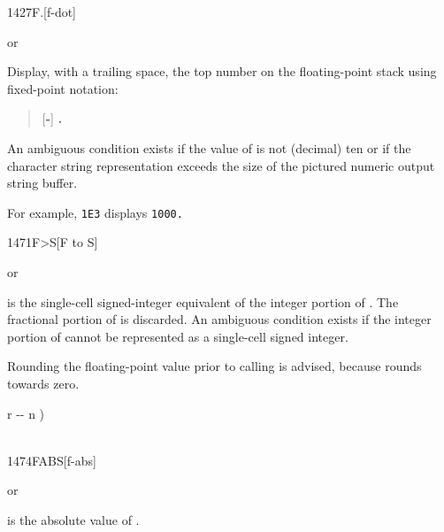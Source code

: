 \enlargethispage{8ex}\vspace*{-1ex}
\begin{worddef}[Fd]{1427}{F.{}}[f-dot]
\item \stack{}{}  or

	Display, with a trailing space, the top number on the
	floating-point stack using fixed-point notation:
	\begin{quote}
		[\textbf{-}] \textbf{.}
	\end{quote}
	An ambiguous condition exists if the value of 
	is not (decimal) ten or if the character string representation
	exceeds the size of the pictured numeric output string buffer.


	\begin{rationale} %
		For example, \texttt{1E3}  displays \texttt{1000.}
	\end{rationale}
\end{worddef}

\vspace*{-1.5ex}
\begin{worddef}[FtoS]{1471}{F>S}[F to S]%
\item {}  or 

	 is the single-cell signed-integer equivalent of the
	integer portion of .  The fractional portion of
	 is discarded.  An ambiguous condition exists if
	the integer portion of  cannot be represented as a
	single-cell signed integer.

\note Rounding the floating-point value prior to calling  is
	advised, because  rounds towards zero.


	\begin{implement} %
		\word{:}   r -{}- n ) \\
		\tab {}  \\
		\word{;}
	\end{implement}
\end{worddef}

\vspace*{-1.5ex}
\begin{worddef}{1474}{FABS}[f-abs]
\item {} or

	 is the absolute value of .
\end{worddef}

